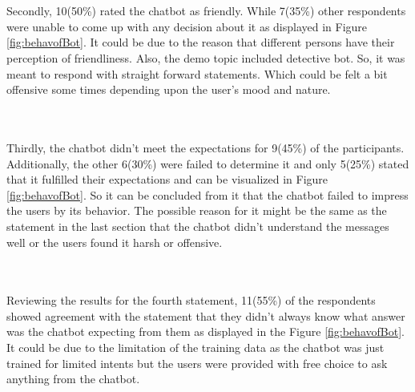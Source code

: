 \\~\\
Secondly, 10(50\%) rated the chatbot as friendly. While 7(35\%) other respondents were unable to come up with any decision about it as displayed in Figure \ref{fig:behavofBot}. It could be due to the reason that different persons have their perception of friendliness. Also, the demo topic included detective bot. So, it was meant to respond with straight forward statements. Which could be felt a bit offensive some times depending upon the user's mood and nature. 

\\~\\
Thirdly, the chatbot didn't meet the expectations for 9(45\%) of the participants. Additionally, the other 6(30\%) were failed to determine it and only 5(25\%) stated that it fulfilled their expectations and can be visualized in Figure \ref{fig:behavofBot}. So it can be concluded from it that the chatbot failed to impress the users by its behavior. The possible reason for it might be the same as the statement in the last section that the chatbot didn't understand the messages well or the users found it harsh or offensive.

\\~\\
Reviewing the results for the fourth statement, 11(55\%) of the respondents showed agreement with the statement that they didn't always know what answer was the chatbot expecting from them as displayed in the Figure \ref{fig:behavofBot}. It could be due to the limitation of the training data as the chatbot was just trained for limited intents but the users were provided with free choice to ask anything from the chatbot. 

